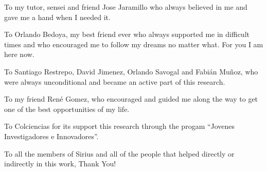 \begin{dedication}
To my tutor, sensei and friend Jose Jaramillo who always believed in me and gave me a hand when I needed it.
\end{dedication}

\begin{dedication}
To Orlando Bedoya, my best friend ever who always supported me in difficult times 
and who encouraged me to follow my dreams no matter what. For you I am here now.
\end{dedication}

\begin{dedication}
To Santiago Restrepo, David Jimenez, Orlando Savogal and Fabián Muñoz, 
who were always unconditional and became an active part of this research.
\end{dedication}

\begin{dedication}
To my friend René Gomez, who encouraged and guided me along the way to 
get one of the best opportunities of my life.
\end{dedication}

\begin{dedication}
To Colciencias for its support this research through the progam
“Jovenes Investigadores e Innovadores”.
\end{dedication}

\begin{dedication}
To all the members of Sirius and all of the people that helped directly or 
indirectly in this work, Thank You!
\end{dedication}
